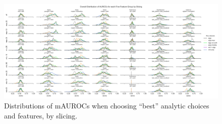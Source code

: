 \documentclass{article}  %
\begin{document}
\begin{spacing}{1}
\begin{figure}
\begin{center}
\includegraphics[width=\textwidth,height=0.9\textheight,keepaspectratio]{best_rmt_params_by_subgroup_and_slicing.png}
\end{center}
\caption
{ \label{fig:best-params-slicing}
Distributions of mAUROCs when choosing ``best'' analytic choices and features, by slicing.}
\end{figure}




\end{spacing}
\end{document}
